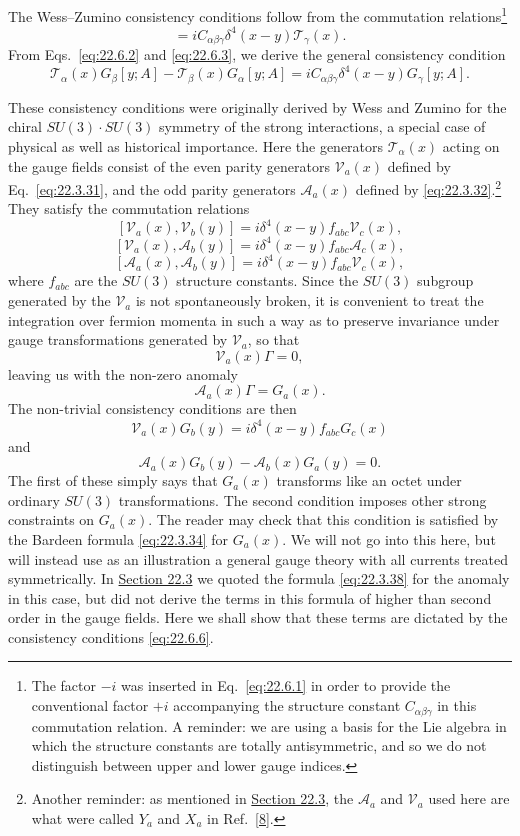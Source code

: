 The Wess--Zumino consistency conditions follow from the commutation
relations\footnote{The factor $-i$ was inserted in
Eq.~\eqref{eq:22.6.1} in order to provide the conventional factor $+i$
accompanying the structure constant $C_{\alpha\beta\gamma}$ in this
commutation relation. A reminder: we are using a basis for the Lie algebra
in which the structure constants are totally antisymmetric, and so we do
not distinguish between upper and lower gauge indices.}
\begin{equation}
 [\mathcal T_\alpha(x),\mathcal T_\beta(y)]
 =iC_{\alpha\beta\gamma}\delta^4(x-y)\mathcal T_\gamma(x).
 \tag{22.6.5}\label{eq:22.6.5}
\end{equation}
From Eqs.~\eqref{eq:22.6.2} and \eqref{eq:22.6.3}, we derive the general
consistency condition
\begin{equation}
 \mathcal T_\alpha(x)G_\beta[y;A]
 -\mathcal T_\beta(x)G_\alpha[y;A]
 =iC_{\alpha\beta\gamma}\delta^4(x-y)G_\gamma[y;A].
 \tag{22.6.6}\label{eq:22.6.6}
\end{equation}

These consistency conditions were originally derived by Wess and Zumino
for the chiral $SU(3)\cdot SU(3)$ symmetry of the strong interactions, a
special case of physical as well as historical importance. Here the
generators $\mathcal T_\alpha(x)$ acting on the gauge fields consist of the
even parity generators $\mathcal V_a(x)$ defined by
Eq.~\eqref{eq:22.3.31}, and the odd parity generators $\mathcal A_a(x)$
defined by \eqref{eq:22.3.32}.\footnote{Another reminder: as mentioned in
\hyperref[sec:22.3]{Section 22.3}, the $\mathcal A_a$ and $\mathcal V_a$
used here are what were called $Y_a$ and $X_a$ in
Ref.~\hyperref[ch22-ref-8]{[8]}.} They satisfy the commutation relations
\[
 [\mathcal V_a(x),\mathcal V_b(y)]
 =i\delta^4(x-y)f_{abc}\mathcal V_c(x),
\]
\[
 [\mathcal V_a(x),\mathcal A_b(y)]
 =i\delta^4(x-y)f_{abc}\mathcal A_c(x),
\]
\[
 [\mathcal A_a(x),\mathcal A_b(y)]
 =i\delta^4(x-y)f_{abc}\mathcal V_c(x),
\]
where $f_{abc}$ are the $SU(3)$ structure constants. Since the $SU(3)$
subgroup generated by the $\mathcal V_a$ is not spontaneously broken, it
is convenient to treat the integration over fermion momenta in such a way
as to preserve invariance under gauge transformations generated by
$\mathcal V_a$, so that
\[
 \mathcal V_a(x)\Gamma=0,
\]
leaving us with the non-zero anomaly
\[
 \mathcal A_a(x)\Gamma=G_a(x).
\]
The non-trivial consistency conditions are then
\[
 \mathcal V_a(x)G_b(y)
 =i\delta^4(x-y)f_{abc}G_c(x)
\]
and
\[
 \mathcal A_a(x)G_b(y)-\mathcal A_b(x)G_a(y)=0.
\]
The first of these simply says that $G_a(x)$ transforms like an octet
under ordinary $SU(3)$ transformations. The second condition imposes
other strong constraints on $G_a(x)$. The reader may check that this
condition is satisfied by the Bardeen formula \eqref{eq:22.3.34} for
$G_a(x)$. We will not go into this here, but will instead use as an
illustration a general gauge theory with all currents treated symmetrically.
In \hyperref[sec:22.3]{Section 22.3} we quoted the formula
\eqref{eq:22.3.38} for the anomaly in this case, but did not derive the
terms in this formula of higher than second order in the gauge fields. Here
we shall show that these terms are dictated by the consistency conditions
\eqref{eq:22.6.6}.

